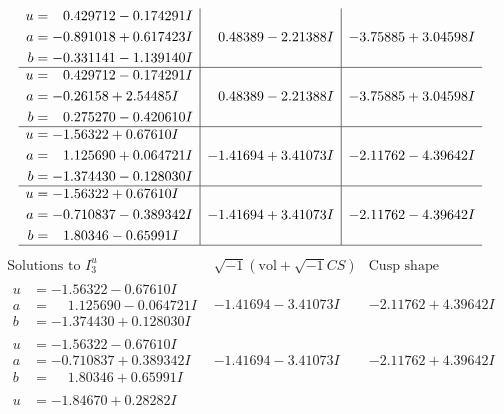 \documentclass[1p]{elsarticle_modified}
\theoremstyle{definition}
\newcommand{\I}{\sqrt{-1}}
\begin{document}
$$\begin{array}{c|c|c}
\begin{aligned}
u &= \phantom{-}0.429712 - 0.174291 I \\
a &= -0.891018 + 0.617423 I \\
b &= -0.331141 - 1.139140 I\end{aligned}
 & \phantom{-}0.48389 - 2.21388 I & -3.75885 + 3.04598 I \\ \hline\begin{aligned}
u &= \phantom{-}0.429712 - 0.174291 I \\
a &= -0.26158 + 2.54485 I \\
b &= \phantom{-}0.275270 - 0.420610 I\end{aligned}
 & \phantom{-}0.48389 - 2.21388 I & -3.75885 + 3.04598 I \\ \hline\begin{aligned}
u &= -1.56322 + 0.67610 I \\
a &= \phantom{-}1.125690 + 0.064721 I \\
b &= -1.374430 - 0.128030 I\end{aligned}
 & -1.41694 + 3.41073 I & -2.11762 - 4.39642 I \\ \hline\begin{aligned}
u &= -1.56322 + 0.67610 I \\
a &= -0.710837 - 0.389342 I \\
b &= \phantom{-}1.80346 - 0.65991 I\end{aligned}
 & -1.41694 + 3.41073 I & -2.11762 - 4.39642 I\\
 \hline 
 \end{array}$$\newpage$$\begin{array}{c|c|c}  
\text{Solutions to }I^u_{3}& \I (\text{vol} + \sqrt{-1}CS) & \text{Cusp shape}\\
 \hline 
\begin{aligned}
u &= -1.56322 - 0.67610 I \\
a &= \phantom{-}1.125690 - 0.064721 I \\
b &= -1.374430 + 0.128030 I\end{aligned}
 & -1.41694 - 3.41073 I & -2.11762 + 4.39642 I \\ \hline\begin{aligned}
u &= -1.56322 - 0.67610 I \\
a &= -0.710837 + 0.389342 I \\
b &= \phantom{-}1.80346 + 0.65991 I\end{aligned}
 & -1.41694 - 3.41073 I & -2.11762 + 4.39642 I \\ \hline\begin{aligned}
u &= -1.84670 + 0.28282 I \\

\end{aligned}
\end{array}$$
\end{document}
